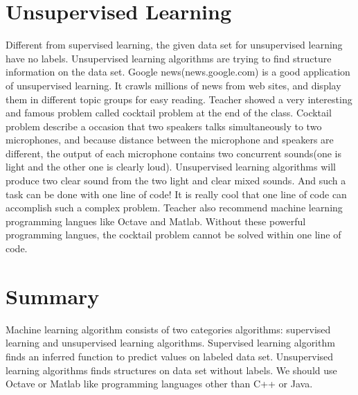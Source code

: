 \documentclass{article}
\begin{document}
\section{Unsupervised Learning}
Different from supervised learning, the given data set for unsupervised learning have no labels. Unsupervised learning algorithms are trying to find structure information on the data set. Google news(news.google.com) is a good application of unsupervised learning. It crawls millions of news from web sites, and display them in different topic groups for easy reading. Teacher showed a very interesting and famous problem called cocktail problem at the end of the class. Cocktail problem describe a occasion that two speakers talks simultaneously to two microphones, and because distance between the microphone and speakers are different, the output of each microphone contains two concurrent sounds(one is light and the other one is clearly loud). Unsupervised learning algorithms will produce two clear sound from the two light and clear mixed sounds. And such a task can be done with one line of code! It is really cool that one line of code can accomplish such a complex problem. Teacher also recommend machine learning programming langues like Octave and Matlab. Without these powerful programming langues, the cocktail problem cannot be solved within one line of code.

\section{Summary}
Machine learning algorithm consists of two categories algorithms: supervised learning and unsupervised learning algorithms. Supervised learning algorithm finds an inferred function to predict values on labeled data set. Unsupervised learning algorithms finds structures on data set without labels. We should use Octave or Matlab like programming languages other than C++ or Java.
\end{document}
